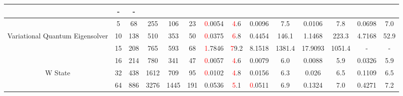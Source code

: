 \begin{table}[htb]
{\begin{tabular}{|c|c|c|c|c|c|c|c|c|c|c|c|c|c|}
 & - & -
 \\
\hline
 & 
5 & 68 & 255 & 106 & 23
 & \textcolor{red}0.0054 & \textcolor{red}4.6
 & 0.0096 & 7.5
 & 0.0106 & 7.8
 & 0.0698 & 7.0
 \\
Variational Quantum Eigensolver & 
10 & 138 & 510 & 353 & 50
 & \textcolor{red}0.0375 & \textcolor{red}6.8
 & 0.4454 & 146.1
 & 1.1468 & 223.3
 & 4.7168 & 52.9
 \\
 & 
15 & 208 & 765 & 593 & 68
 & \textcolor{red}1.7846 & \textcolor{red}79.2
 & 8.1518 & 1381.4
 & 17.9093 & 1051.4
 & - & -
 \\
\hline
 & 
16 & 214 & 780 & 341 & 47
 & \textcolor{red}0.0057 & \textcolor{red}4.6
 & 0.0079 & 6.0
 & 0.0088 & 5.9
 & 0.0326 & 5.9
 \\
W State & 
32 & 438 & 1612 & 709 & 95
 & \textcolor{red}0.0102 & \textcolor{red}4.8
 & 0.0156 & 6.3
 & 0.026 & 6.5
 & 0.1109 & 6.5
 \\
 & 
64 & 886 & 3276 & 1445 & 191
 & 0.0536 & \textcolor{red}5.1
 & \textcolor{red}0.0511 & 6.9
 & 0.1324 & 7.0
 & 0.4271 & 7.2
 \\
\hline
\end{tabular}}
\end{table}